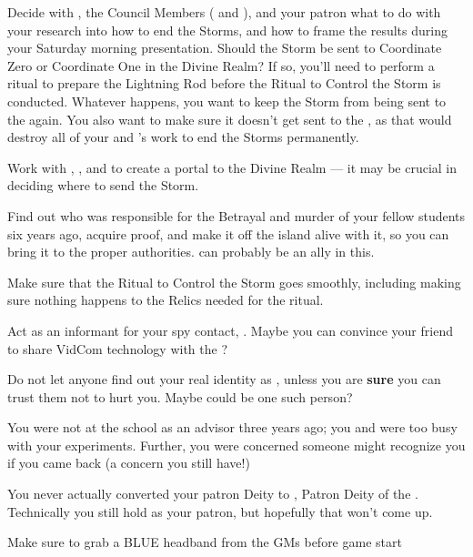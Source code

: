\documentclass[char]{GL2020}
\begin{document}
\begin{itemz}
    \item Decide with \cHeadScientist{}, the Council Members (\cAntiChup{} and \cTechStar{}), and your patron \cDiplomat{} what to do with your research into how to end the Storms, and how to frame the results during your Saturday morning presentation. Should the Storm be sent to Coordinate Zero or Coordinate One in the Divine Realm? If so, you'll need to perform a ritual to prepare the Lightning Rod before the Ritual to Control the Storm is conducted. Whatever happens, you want to keep the Storm from being sent to the \pShip{} again. You also want to make sure it doesn’t get sent to the \pTech{}, as that would destroy all of your and \cHeadScientist{}’s work to end the Storms permanently.
    \item Work with \cCurse{}, \cFlowPriest{}, and \cAmbition{} to create a portal to the Divine Realm — it may be crucial in deciding where to send the Storm.
    \item Find out who was responsible for the Betrayal and murder of your fellow students six years ago, acquire proof, and make it off the island alive with it, so you can bring it to the proper authorities. \cHeir{} can probably be an ally in this.
\end{itemz}

\begin{itemz}
    \item Make sure that the Ritual to Control the Storm goes smoothly, including making sure nothing happens to the Relics needed for the ritual. 
    \item Act as an informant for your \pShippie{} spy contact, \cBunker{}. Maybe you can convince your friend \cTechStar{} to share \cTechStar{\their} VidCom technology with the \pShippies{}?
    \item Do not let anyone find out your real identity as \cKidScientist{\full}, unless you are \textbf{sure} you can trust them not to hurt you. Maybe \cMusic{} could be one such person? 
\end{itemz}

\begin{itemz}[Notes]
    \item You were not at the school as an advisor three years ago; you and \cHeadScientist{} were too busy with your experiments. Further, you were concerned someone might recognize you if you came back (a concern you still have!)
    \item You never actually converted your patron Deity to \cTechGod{\intro}, Patron Deity of the \pTech{}. Technically you still hold \cFarmGod{} as your patron, but hopefully that won't come up.
		\item Make sure to grab a BLUE headband from the GMs before game start
\end{itemz}
\end{document}
